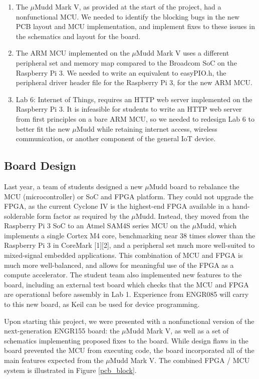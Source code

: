 \documentclass[12pt]{article}
\begin{document}
    \begin{enumerate}
        \item The $\mu$Mudd Mark V, as provided at the start of the project, had a nonfunctional MCU. We needed to identify the blocking bugs in the new PCB layout and MCU implementation, and implement fixes to these issues in the schematics and layout for the board.
        \item The ARM MCU implemented on the $\mu$Mudd Mark V uses a different peripheral set and memory map compared to the Broadcom SoC on the Raspberry Pi 3. We needed to write an equivalent to easyPIO.h, the peripheral driver header file for the Raspberry Pi 3, for the new ARM MCU.
        \item Lab 6: Internet of Things, requires an HTTP web server implemented on the Raspberry Pi 3. It is infeasible for students to write an HTTP web server from first principles on a bare ARM MCU, so we needed to redesign Lab 6 to better fit the new $\mu$Mudd while retaining internet access, wireless communication, or another component of the general IoT device.
    \end{enumerate}
\subsection{Board Design}
    Last year, a team of students designed a new $\mu$Mudd board to rebalance the MCU (microcontroller) or SoC  and FPGA platform. They could not upgrade the FPGA, as the current Cyclone IV is the highest-end FPGA available in a hand-solderable form factor as required by the $\mu$Mudd. Instead, they moved from the Raspberry Pi 3 SoC to an Atmel SAM4S series MCU on the $\mu$Mudd, which implements a single Cortex M4 core, benchmarking near 38 times slower than the Raspberry Pi 3 in CoreMark [1][2], and a peripheral set much more well-suited to mixed-signal embedded applications. This combination of MCU and FPGA is much more well-balanced, and allows for meaningful use of the FPGA as a compute accelerator. The student team also implemented new features to the board, including an external test board which checks that the MCU and FPGA are operational before assembly in Lab 1. Experience from ENGR085 will carry to this new board, as Keil can be used for device programming.
    
    Upon starting this project, we were presented with a nonfunctional version of the next-generation ENGR155 board: the $\mu$Mudd Mark V, as well as a set of schematics implementing proposed fixes to the board. While design flaws in the board prevented the MCU from executing code, the board incorporated all of the main features expected from the $\mu$Mudd Mark V. The combined FPGA / MCU system is illustrated in Figure \ref{pcb_block}.
    
\end{document}
